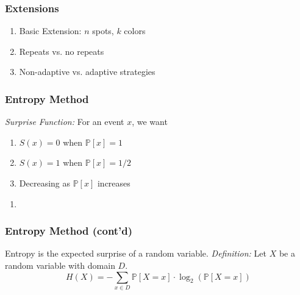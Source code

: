 \documentclass{beamer}
\begin{document}
    \begin{frame}
    	\frametitle{Extensions}
		\begin{enumerate}[label=\roman*.]
		\item Basic Extension: $n$ spots, $k$ colors
		\item Repeats vs. no repeats
		\item Non-adaptive vs. adaptive strategies
		\end{enumerate}
    \end{frame}
    
    \begin{frame}
    \frametitle{Entropy Method}
    \textit{Surprise Function:} For an event $x$, we want
    	\begin{enumerate}[label=\arabic*.]
		\item $S(x) = 0$ when $\mathbb{P}[x]=1$
		\item $S(x) = 1$ when $\mathbb{P}[x]=1/2$
		\item Decreasing as $\mathbb{P}[x]$ increases\\
		\end{enumerate}
	\begin{enumerate}[label=]
	\item{}
	\end{enumerate}
	\end{frame}
	
	\begin{frame}
	\frametitle{Entropy Method (cont'd)}
	Entropy is the expected surprise of a random variable.
	\textit{Definition:} Let $X$ be a random variable with domain $D$.
			\begin{equation*}
			H(X) = -\sum_{x\in D}\mathbb{P}[X=x]\cdot\log_2\left(\mathbb{P}[X=x]\right)
			\end{equation*}
    \end{frame}
    
\end{document}

